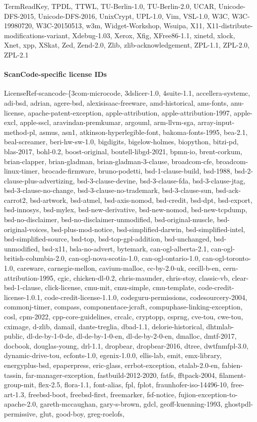\documentclass[10pt]{article} %
\begin{document}
TermReadKey, TPDL, TTWL, TU-Berlin-1.0, TU-Berlin-2.0, UCAR, Unicode-DFS-2015, Unicode-DFS-2016, UnixCrypt, UPL-1.0, Vim, VSL-1.0, W3C, W3C-19980720, W3C-20150513, w3m, Widget-Workshop, Wsuipa, X11, X11-distribute-modifications-variant, Xdebug-1.03, Xerox, Xfig, XFree86-1.1, xinetd, xlock, Xnet, xpp, XSkat, Zed, Zend-2.0, Zlib, zlib-acknowledgement, ZPL-1.1, ZPL-2.0, ZPL-2.1

\paragraph{ScanCode-specific license IDs} LicenseRef-scancode-\{3com-microcode, 3dslicer-1.0, 4suite-1.1, accellera-systemc, adi-bsd, adrian, agere-bsd, alexisisaac-freeware, amd-historical, ams-fonts, anu-license, apache-patent-exception, apple-attribution, apple-attribution-1997, apple-excl, apple-sscl, aravindan-premkumar, argouml, arm-llvm-sga, array-input-method-pl, asmus, asn1, atkinson-hyperlegible-font, bakoma-fonts-1995, bea-2.1, beal-screamer, beri-hw-sw-1.0, bigdigits, bigelow-holmes, biopython, bitzi-pd, blas-2017, bohl-0.2, boost-original, boutell-libgd-2021, bpmn-io, brent-corkum, brian-clapper, brian-gladman, brian-gladman-3-clause, broadcom-cfe, broadcom-linux-timer, brocade-firmware, bruno-podetti, bsd-1-clause-build, bsd-1988, bsd-2-clause-plus-advertizing, bsd-3-clause-devine, bsd-3-clause-fda, bsd-3-clause-jtag, bsd-3-clause-no-change, bsd-3-clause-no-trademark, bsd-3-clause-sun, bsd-ack-carrot2, bsd-artwork, bsd-atmel, bsd-axis-nomod, bsd-credit, bsd-dpt, bsd-export, bsd-innosys, bsd-mylex, bsd-new-derivative, bsd-new-nomod, bsd-new-tcpdump, bsd-no-disclaimer, bsd-no-disclaimer-unmodified, bsd-original-muscle, bsd-original-voices, bsd-plus-mod-notice, bsd-simplified-darwin, bsd-simplified-intel, bsd-simplified-source, bsd-top, bsd-top-gpl-addition, bsd-unchanged, bsd-unmodified, bsd-x11, bsla-no-advert, bytemark, can-ogl-alberta-2.1, can-ogl-british-columbia-2.0, can-ogl-nova-scotia-1.0, can-ogl-ontario-1.0, can-ogl-toronto-1.0, careware, carnegie-mellon, cavium-malloc, cc-by-2.0-uk, cecill-b-en, cern-attribution-1995, cgic, chicken-dl-0.2, chris-maunder, chris-stoy, classic-vb, clear-bsd-1-clause, click-license, cmu-mit, cmu-simple, cmu-template, code-credit-license-1.0.1, code-credit-license-1.1.0, codeguru-permissions, codesourcery-2004, commonj-timer, compass, componentace-jcraft, compuphase-linking-exception, cosl, cpm-2022, cpp-core-guidelines, crcalc, cryptopp, csprng, cve-tou, cwe-tou, cximage, d-zlib, damail, dante-treglia, dbad-1.1, delorie-historical, dhtmlab-public, dl-de-by-1-0-de, dl-de-by-1-0-en, dl-de-by-2-0-en, dmalloc, dmtf-2017, docbook, douglas-young, drl-1.1, dropbear, dropbear-2016, dtree, dwtfnmfpl-3.0, dynamic-drive-tou, ecfonts-1.0, egenix-1.0.0, ellis-lab, emit, emx-library, energyplus-bsd, epaperpress, eric-glass, errbot-exception, etalab-2.0-en, fabien-tassin, far-manager-exception, fastbuild-2012-2020, fatfs, fftpack-2004, filament-group-mit, flex-2.5, flora-1.1, font-alias, fpl, fplot, fraunhofer-iso-14496-10, free-art-1.3, freebsd-boot, freebsd-first, freemarker, fsf-notice, fujion-exception-to-apache-2.0, gareth-mccaughan, gary-s-brown, gdcl, geoff-kuenning-1993, ghostpdl-permissive, glut, good-boy, greg-roelofs, 
\end{document}
